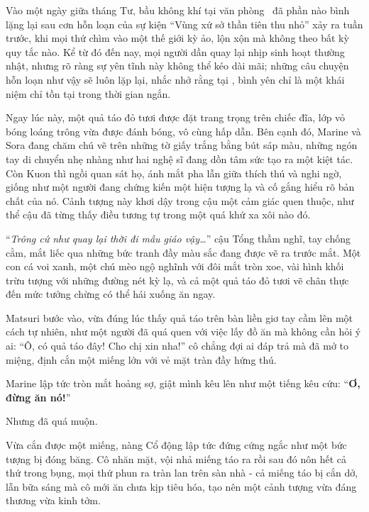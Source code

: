 \documentclass[../main.tex]{subfiles}
\begin{document}
Vào một ngày giữa tháng Tư, bầu không khí tại văn phòng \hll\ đã phần nào bình lặng lại sau cơn hỗn loạn của sự kiện ``Vùng xứ sở thần tiên thu nhỏ'' xảy ra tuần trước, khi mọi thứ chìm vào một thế giới kỳ ảo, lộn xộn mà không theo bất kỳ quy tắc nào. Kể từ đó đến nay, mọi người dần quay lại nhịp sinh hoạt thường nhật, nhưng rõ ràng sự yên tĩnh này không thể kéo dài mãi; những câu chuyện hỗn loạn như vậy sẽ luôn lặp lại, nhắc nhở rằng tại \hll, bình yên chỉ là một khái niệm chỉ tồn tại trong thời gian ngắn.

Ngay lúc này, một quả táo đỏ tươi được đặt trang trọng trên chiếc đĩa, lớp vỏ bóng loáng trông vừa được đánh bóng, vô cùng hấp dẫn. Bên cạnh đó, Marine và Sora đang chăm chú vẽ trên những tờ giấy trắng bằng bút sáp màu, những ngón tay di chuyển nhẹ nhàng như hai nghệ sĩ đang dồn tâm sức tạo ra một kiệt tác. Còn Kuon thì ngồi quan sát họ, ánh mắt pha lẫn giữa thích thú và nghi ngờ, giống như một người đang chứng kiến một hiện tượng lạ và cố gắng hiểu rõ bản chất của nó. Cảnh tượng này khơi dậy trong cậu một cảm giác quen thuộc, như thể cậu đã từng thấy điều tương tự trong một quá khứ xa xôi nào đó.


``\textit{Trông cứ như quay lại thời đi mẫu giáo vậy\dots}'' cậu Tổng thầm nghĩ, tay chống cằm, mắt liếc qua những bức tranh đầy màu sắc đang được vẽ ra trước mắt. Một con cá voi xanh, một chú mèo ngộ nghĩnh với đôi mắt tròn xoe, vài hình khối trừu tượng với những đường nét kỳ lạ, và cả một quả táo đỏ tươi vẽ chân thực đến mức tưởng chừng có thể hái xuống ăn ngay.

Matsuri bước vào, vừa đúng lúc thấy quả táo trên bàn liền giơ tay cầm lên một cách tự nhiên, như một người đã quá quen với việc lấy đồ ăn mà không cần hỏi ý ai: ``Ô, có quả táo đây! Cho chị xin nha!'' cô chẳng đợi ai đáp trả mà đã mở to miệng, định cắn một miếng lớn với vẻ mặt tràn đầy hứng thú.

Marine lập tức tròn mắt hoảng sợ, giật mình kêu lên như một tiếng kêu cứu: ``\textbf{Ơ, đừng ăn nó!}''

Nhưng đã quá muộn.

Vừa cắn được một miếng, nàng Cổ động lập tức đứng cứng ngắc như một bức tượng bị đóng băng. Cô nhăn mặt, vội nhả miếng táo ra rồi sau đó nôn hết cả thứ trong bụng, mọi thứ phun ra tràn lan trên sàn nhà - cả miếng táo bị cắn dở, lẫn bữa sáng mà cô mới ăn chưa kịp tiêu hóa, tạo nên một cảnh tượng vừa đáng thương vừa kinh tởm.

\end{document}
